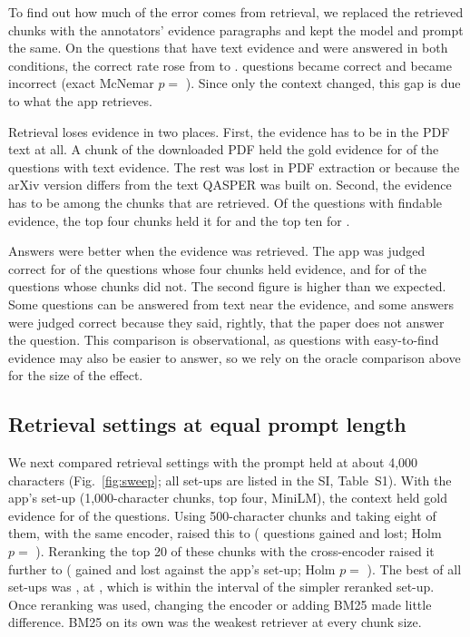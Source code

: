To find out how much of the error comes from retrieval, we replaced the retrieved chunks with the
annotators' evidence paragraphs and kept the model and prompt the same. On the \PairedOracleN{}
questions that have text evidence and were answered in both conditions, the correct rate rose
from \PairedFixedOnOracleQuestions{} to \OracleCorrect{}. \PairedOracleGained{} questions became
correct and \PairedOracleLost{} became incorrect (exact McNemar $p =$ \PairedOracleP{}). Since
only the context changed, this gap is due to what the app retrieves.

Retrieval loses evidence in two places. First, the evidence has to be in the PDF text at all. A
chunk of the downloaded PDF held the gold evidence for \Findable{} of the \TextEvidenceQuestions{}
questions with text evidence. The rest was lost in PDF extraction or because the arXiv version
differs from the text QASPER was built on. Second, the evidence has to be among the chunks that
are retrieved. Of the \FindableK{} questions with findable evidence, the top four chunks held it
for \HitFour{} and the top ten for \HitTen{}.

Answers were better when the evidence was retrieved. The app was judged correct for
\CorrectWhenHit{} of the \CorrectWhenHitN{} questions whose four chunks held evidence, and for
\CorrectWhenMiss{} of the \CorrectWhenMissN{} questions whose chunks did not. The second figure is
higher than we expected. Some questions can be answered from text near the evidence, and some
answers were judged correct because they said, rightly, that the paper does not answer the
question. This comparison is observational, as questions with easy-to-find evidence may also be
easier to answer, so we rely on the oracle comparison above for the size of the effect.

\subsection{Retrieval settings at equal prompt length}
\label{sec:res-sweep}

We next compared retrieval settings with the prompt held at about 4,000 characters
(Fig.~\ref{fig:sweep}; all set-ups are listed in the SI, Table~S1). With the app's set-up
(1,000-character chunks, top four, MiniLM), the context held gold evidence for
\SweepBaseBudget{} of the \SweepQuestions{} questions. Using 500-character chunks and taking
eight of them, with the same encoder, raised this to \SweepSmallBudget{} (\SweepSmallGained{}
questions gained and \SweepSmallLost{} lost; Holm $p =$ \SweepSmallP{}). Reranking the top 20 of
these chunks with the cross-encoder raised it further to \SweepSmallRerankBudget{}
(\SweepSmallRerankGained{} gained and \SweepSmallRerankLost{} lost against the app's set-up;
Holm $p =$ \SweepSmallRerankP{}). The best of all \SweepSetups{} set-ups was \SweepBestName{},
at \SweepBestBudget{}, which is within the interval of the simpler reranked set-up. Once
reranking was used, changing the encoder or adding BM25 made little difference. BM25 on its own
was the weakest retriever at every chunk size.

